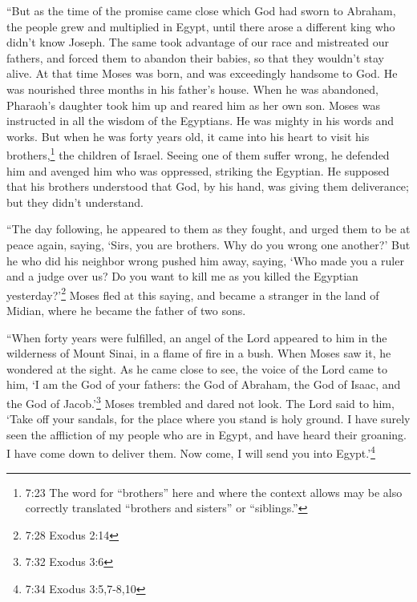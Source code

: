 \myverse{}“But as the time of the promise came close which God had sworn
to Abraham, the people grew and multiplied in Egypt,
\myverse{}until there arose a different king who didn’t know Joseph.
\myverse{}The same took advantage of our race and mistreated our fathers, and forced
them to abandon their babies, so that they wouldn’t stay alive.
\myverse{}At that time Moses was born, and was exceedingly handsome to God. He was nourished
three months in his father’s house.
\myverse{}When he was abandoned, Pharaoh’s daughter took him up and reared him as her
own son.
\myverse{}Moses was instructed in all the wisdom of the Egyptians. He was mighty in
his words and works.
\myverse{}But when he was forty years old, it came into his heart to visit his brothers,\footnote{7:23 The word for “brothers” here and where the context allows may be also correctly translated “brothers
	and sisters” or “siblings.”} the children of Israel.
\myverse{}Seeing one of them suffer wrong, he defended him and avenged him who was oppressed,
striking the Egyptian.
\myverse{}He supposed that his brothers understood that God, by his hand, was giving
them deliverance; but they didn’t understand.

\myverse{}“The day following, he appeared to them as they fought, and urged
them to be at peace again, saying, ‘Sirs, you are brothers. Why do you wrong one another?’
\myverse{}But he who did his neighbor wrong pushed him away, saying, ‘Who made you a
ruler and a judge over us?
\myverse{}Do you want to kill me as you killed the Egyptian yesterday?’\footnote{7:28 Exodus 2:14}
\myverse{}Moses fled at this saying, and became a stranger in the land of Midian, where
he became the father of two sons.

\myverse{}“When forty years were fulfilled, an angel of the Lord appeared
to him in the wilderness of Mount Sinai, in a flame of fire in a bush.
\myverse{}When Moses saw it, he wondered at the sight. As he came close to see, the
voice of the Lord came to him,
\myverse{}‘I am the God of your fathers: the God of Abraham, the God of Isaac, and the
God of Jacob.’\footnote{7:32 Exodus 3:6} Moses trembled and dared not look.
\myverse{}The Lord said to him, ‘Take off your sandals, for the place where you stand
is holy ground.
\myverse{}I have surely seen the affliction of my people who are in Egypt, and have
heard their groaning. I have come down to deliver them. Now come, I will send you into Egypt.’\footnote{7:34 Exodus 3:5,7-8,10}

